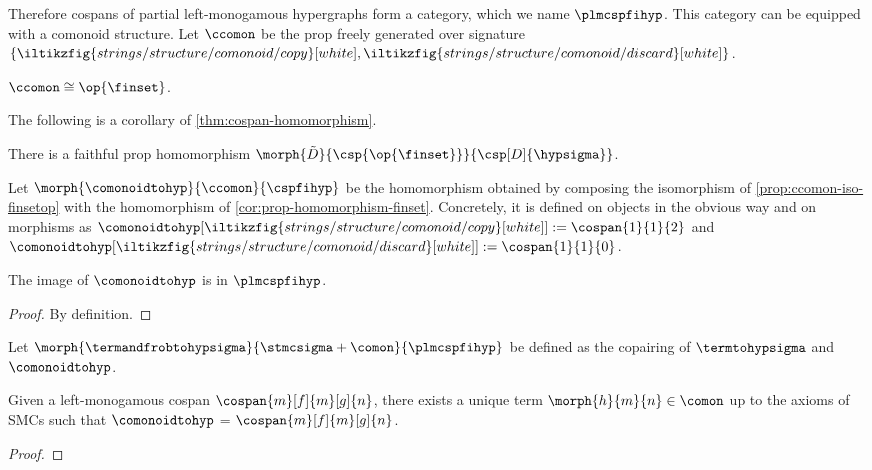 \noindent
Therefore cospans of partial left-monogamous hypergraphs form a category, which we name \(\plmcspfihyp\).
This category can be equipped with a comonoid structure.
Let \(\ccomon\) be the prop freely generated over signature \(
    \{
        \iltikzfig{strings/structure/comonoid/copy}[white],
        \iltikzfig{strings/structure/comonoid/discard}[white]
    \}
\).

\begin{proposition}
    \label{prop:ccomon-iso-finsetop}
    \(\ccomon \cong \op{\finset}\).
\end{proposition}

\noindent
The following is a corollary of \cref{thm:cospan-homomorphism}.

\begin{corollary}
    \label{cor:prop-homomorphism-finset}
    There is a faithful prop homomorphism \(\morph{\tilde{D}}{\csp{\op{\finset}}}{\csp[D]{\hypsigma}}\).
\end{corollary}

\begin{definition}
    Let \(\morph{\comonoidtohyp}{\ccomon}{\cspfihyp}\) be the homomorphism obtained by composing the isomorphism of \cref{prop:ccomon-iso-finsetop} with the homomorphism of \cref{cor:prop-homomorphism-finset}.
    Concretely, it is defined on objects in the obvious way and on morphisms as \(\comonoidtohyp[\iltikzfig{strings/structure/comonoid/copy}[white]] := \cospan{1}{1}{2}\) and \(\comonoidtohyp[\iltikzfig{strings/structure/comonoid/discard}[white]] := \cospan{1}{1}{0}\).
\end{definition}

\begin{lemma}
    The image of \(\comonoidtohyp\) is in \(\plmcspfihyp\).
\end{lemma}
\begin{proof}
    By definition.
\end{proof}

\begin{definition}
    Let \(\morph{\termandfrobtohypsigma}{\stmcsigma + \comon}{\plmcspfihyp}\) be defined as the copairing of \(\termtohypsigma\) and \(\comonoidtohyp\).
\end{definition}

\begin{lemma}
    Given a left-monogamous cospan \(\cospan{m}[f]{m}[g]{n}\), there exists a unique term \(\morph{h}{m}{n} \in \comon\) up to the axioms of SMCs such that \(\comonoidtohyp\) = \(\cospan{m}[f]{m}[g]{n}\).
\end{lemma}
\begin{proof}

\end{proof}

